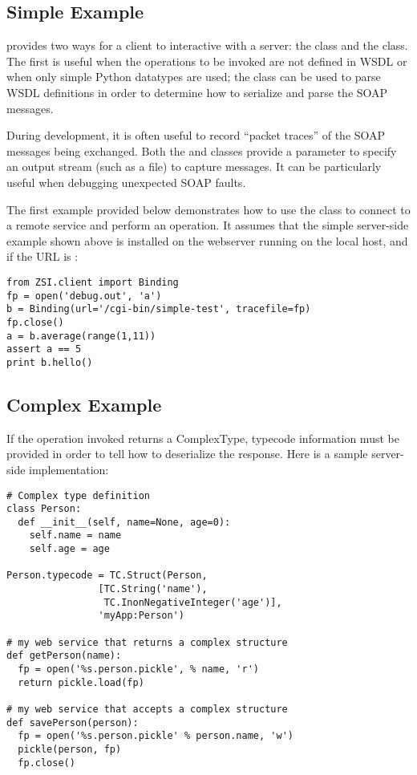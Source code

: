 \subsection{Simple Example}
\ZSI{} provides two ways for a client to interactive with a server:
the  class and the  class.
The first is useful when the operations to be invoked are not defined
in WSDL or when only simple Python datatypes are used; the 
class can be used to parse WSDL definitions in order
to determine how to serialize and parse the SOAP messages.

During development, it is often useful to record ``packet traces'' of
the SOAP messages being exchanged.
Both the  and  classes provide a
 parameter to specify an output stream (such as a file)
to capture messages.
It can be particularly useful when debugging unexpected SOAP faults.

The first example provided below demonstrates how to use the 
class to connect to a remote service and perform an operation.  It assumes
that the simple server-side example shown above is installed on the webserver 
running on the local host, and if the URL is :

\begin{verbatim}
from ZSI.client import Binding
fp = open('debug.out', 'a')
b = Binding(url='/cgi-bin/simple-test', tracefile=fp)
fp.close()
a = b.average(range(1,11))
assert a == 5
print b.hello()
\end{verbatim}

\subsection{Complex Example}
If the operation invoked returns a ComplexType, typecode information must
be provided in order to tell \ZSI{} how to deserialize the response.
Here is a sample server-side implementation:

\begin{verbatim}
# Complex type definition
class Person:
  def __init__(self, name=None, age=0):
    self.name = name
    self.age = age

Person.typecode = TC.Struct(Person,
			    [TC.String('name'),
			     TC.InonNegativeInteger('age')],
			    'myApp:Person')

# my web service that returns a complex structure
def getPerson(name):
  fp = open('%s.person.pickle', % name, 'r')
  return pickle.load(fp)

# my web service that accepts a complex structure
def savePerson(person):
  fp = open('%s.person.pickle' % person.name, 'w')
  pickle(person, fp)
  fp.close()
\end{verbatim}


